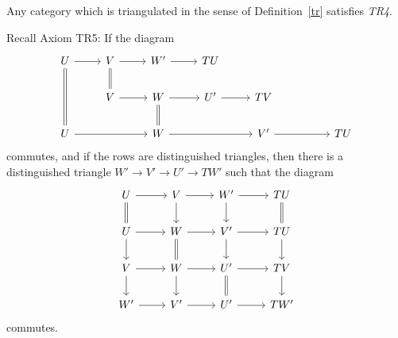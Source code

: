 \documentclass[12pt]{article}
\theoremstyle{remark}
\theoremstyle{definition}
\begin{document}
\begin{cor}
Any category which is triangulated in the sense of Definition~\ref{tr} satisfies {\em TR4}.
\end{cor} 

Recall Axiom TR5: If the diagram 
$$
\begin{tikzcd}
U\ar[equal]{dd}\ar{r}&V\ar[equal]{d}\ar{r}&W'\ar{r}&TU\\
&V\ar{r}&W\ar[equal]{d}\ar{r}&U'\ar{r}&TV\\
U\ar{rr}&&W\ar{rr}&&V'\ar{rr}&&TU
\end{tikzcd}
$$
commutes, and if the rows are distinguished triangles, then there is a distinguished triangle $W'\to V'\to U'\to TW'$ such that the diagram 
$$
\begin{tikzcd}
U\ar{r}\ar[equal]{d}&V\ar{d}\ar{r}&W'\ar{d}\ar{r}&TU\ar[equal]{d}\\
U\ar{d}\ar{r}&W\ar{r}\ar[equal]{d}&V'\ar{d}\ar{r}&TU\ar{d}\\
V\ar{d}\ar{r}&W\ar{d}\ar{r}&U'\ar{r}\ar[equal]{d}&TV\ar{d}\\
W'\ar{r}&V'\ar{r}&U'\ar{r}&TW' 
\end{tikzcd}
$$ 
commutes. 
\end{document}
